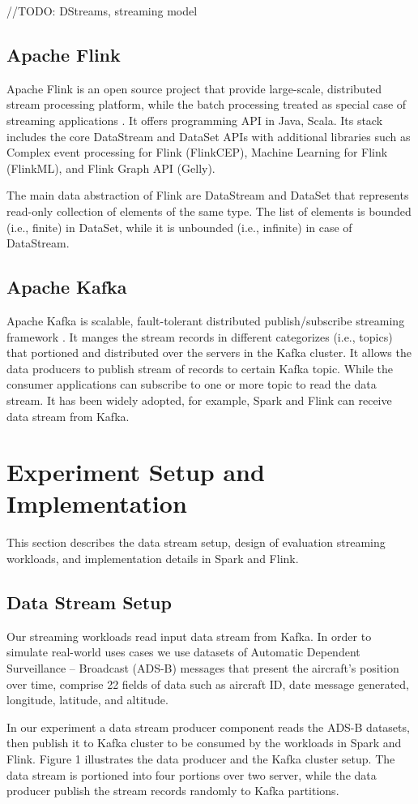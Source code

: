 \documentclass[]{article}
\begin{document}
//TODO: DStreams, streaming model

\subsection{Apache Flink}

Apache Flink is an open source project that provide large-scale, distributed stream processing platform, while the batch processing treated as special case of streaming applications \cite{flink}.
It offers programming API in Java, Scala. Its stack includes the core DataStream and DataSet APIs with additional libraries such as Complex event processing for Flink (FlinkCEP), Machine Learning for Flink (FlinkML), and Flink Graph API (Gelly).

The main data abstraction of Flink are DataStream and DataSet that represents read-only collection of elements of the same type. The list of elements is bounded (i.e., finite) in DataSet, while it is unbounded (i.e., infinite) in case of DataStream.


\subsection{Apache Kafka}
Apache Kafka is scalable, fault-tolerant distributed publish/subscribe streaming framework \cite{kafka}.
It manges the stream records in different categorizes (i.e., topics) that portioned and distributed over the servers in the Kafka cluster. It allows the data producers to publish stream of records to certain Kafka topic. While the consumer applications can subscribe to one or more topic to read the data stream. It has been widely  adopted, for example, 
Spark and Flink can receive data stream from Kafka. 


\section{Experiment Setup and Implementation}
This section describes the data stream setup, design of evaluation streaming workloads, and implementation details in Spark and Flink.

\subsection{Data Stream Setup}
Our streaming workloads read input data stream from Kafka. In order to simulate real-world uses cases we use datasets of Automatic Dependent Surveillance – Broadcast (ADS-B) messages that present the aircraft's position over time, comprise 22 fields of data such as aircraft ID, date message generated, longitude, latitude, and altitude.
\par In our experiment a data stream producer component reads the ADS-B datasets, then publish it to Kafka cluster to be consumed by the workloads in Spark and Flink. Figure 1 illustrates the data producer and the Kafka cluster setup.
The data stream is portioned into four portions over two server, while the data producer publish the stream records randomly to Kafka partitions.
\end{document}
